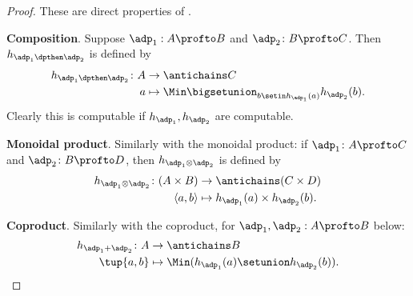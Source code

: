 \begin{proof}
    These are direct properties of \DP.


    \textbf{Composition}.
    Suppose $\adp_1 : A \profto B$ and $\adp_2 \colon B \profto C$.
    Then $h_{\adp_1\dpthen \adp_2} $ is defined by
    \begin{equation}
        \begin{aligned}
            h_{\adp_1 \dpthen \adp_2} \colon A & \to \antichains C \\
            a                                  & \mapsto \Min \bigsetunion_{b \setin h_{\adp_1}(a)} h_{\adp_2}(b).
        \end{aligned}
    \end{equation}
    Clearly this is computable if $h_{\adp_1}, h_{\adp_2}$ are computable.


    \textbf{Monoidal product}.
    Similarly with the monoidal product: if $\adp_1 \colon A \profto C$ and $\adp_2 \colon B \profto D$, then $h_{\adp_1 \otimes \adp_2}$ is defined by
    \begin{equation}
        \begin{aligned}
            h_{\adp_1 \otimes \adp_2} \colon (A \times B) & \to \antichains (C \times D) \\
            \langle a, b \rangle                          & \mapsto h_{\adp_1}(a) \times h_{\adp_2}(b).
        \end{aligned}
    \end{equation}

    \textbf{Coproduct}.
    Similarly with the coproduct, for $\adp_1, \adp_2 : A \profto B$ below:
    \begin{equation}
        \begin{aligned}
            h_{\adp_1 + \adp_2} \colon A & \to \antichains B \\
            \tup{a,b}                    & \mapsto \Min (h_{\adp_1}(a) \setunion h_{\adp_2}(b)).
        \end{aligned}
    \end{equation}

\end{proof}

